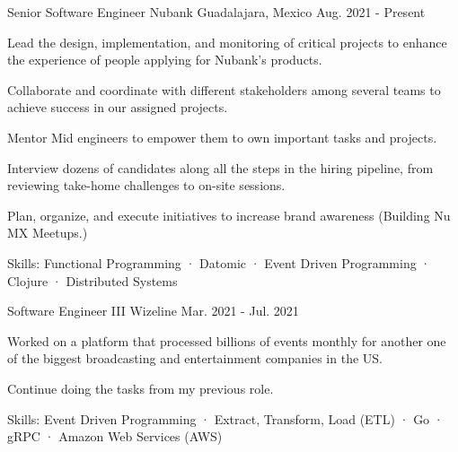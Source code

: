 

\begin{cventries}

  \cventry
    {Senior Software Engineer} %
    {Nubank} %
    {Guadalajara, Mexico} %
    {Aug. 2021 - Present} %
    {
      \begin{cvitems} %
        \item {Lead the design, implementation, and monitoring of critical projects to enhance the experience of people applying for Nubank's products.}
        \item {Collaborate and coordinate with different stakeholders among several teams to achieve success in our assigned projects.}
        \item {Mentor Mid engineers to empower them to own important tasks and projects.}
        \item {Interview dozens of candidates along all the steps in the hiring pipeline, from reviewing take-home challenges to on-site sessions.}
        \item {Plan, organize, and execute initiatives to increase brand awareness (Building Nu MX Meetups.)}
        \item {Skills: Functional Programming · Datomic · Event Driven Programming · Clojure · Distributed Systems}
      \end{cvitems}
    }

  \cventry
    {Software Engineer III} %
    {Wizeline} %
    {} %
    {Mar. 2021 - Jul. 2021} %
    {
      \begin{cvitems} %
        \item {Worked on a platform that processed billions of events monthly for another one of the biggest broadcasting and entertainment companies in the US.}
        \item {Continue doing the tasks from my previous role.}
        \item {Skills: Event Driven Programming · Extract, Transform, Load (ETL) · Go · gRPC · Amazon Web Services (AWS)}
      \end{cvitems}
    }


\end{cventries}
